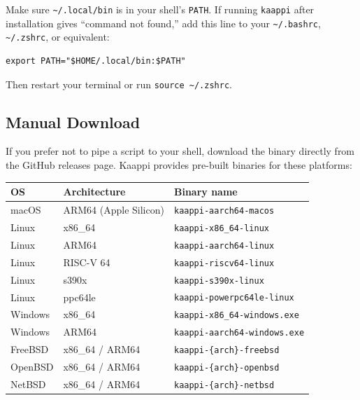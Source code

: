 \begin{warning}
Make sure \texttt{\textasciitilde/.local/bin} is in your shell's \texttt{PATH}. If running \texttt{kaappi} after installation gives ``command not found,'' add this line to your \texttt{\textasciitilde/.bashrc}, \texttt{\textasciitilde/.zshrc}, or equivalent:

\begin{Verbatim}[fontsize=\small]
export PATH="$HOME/.local/bin:$PATH"
\end{Verbatim}

Then restart your terminal or run \texttt{source \textasciitilde/.zshrc}.
\end{warning}

\subsection{Manual Download}

If you prefer not to pipe a script to your shell, download the binary directly from the GitHub releases page. Kaappi provides pre-built binaries for these platforms:

\begin{center}
\begin{tabular}{lll}
\textbf{OS} & \textbf{Architecture} & \textbf{Binary name} \\
\hline
macOS & ARM64 (Apple Silicon) & \texttt{kaappi-aarch64-macos} \\
Linux & x86\_64 & \texttt{kaappi-x86\_64-linux} \\
Linux & ARM64 & \texttt{kaappi-aarch64-linux} \\
Linux & RISC-V 64 & \texttt{kaappi-riscv64-linux} \\
Linux & s390x & \texttt{kaappi-s390x-linux} \\
Linux & ppc64le & \texttt{kaappi-powerpc64le-linux} \\
Windows & x86\_64 & \texttt{kaappi-x86\_64-windows.exe} \\
Windows & ARM64 & \texttt{kaappi-aarch64-windows.exe} \\
FreeBSD & x86\_64 / ARM64 & \texttt{kaappi-\{arch\}-freebsd} \\
OpenBSD & x86\_64 / ARM64 & \texttt{kaappi-\{arch\}-openbsd} \\
NetBSD & x86\_64 / ARM64 & \texttt{kaappi-\{arch\}-netbsd} \\
\end{tabular}
\end{center}

